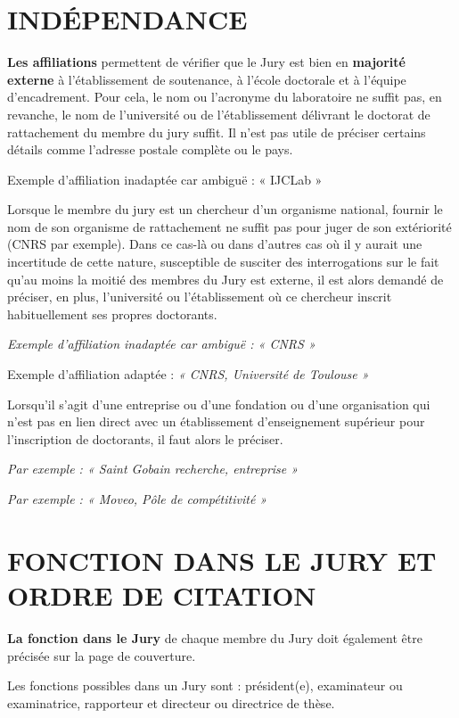 \documentclass[main=french,a4paper]{book}
\begin{document}
\section{INDÉPENDANCE}
\textbf{Les affiliations} permettent de vérifier que le Jury est bien en \textbf{majorité externe} à l’établissement de soutenance, à l’école doctorale et à l’équipe d’encadrement. 
Pour cela, le nom ou l’acronyme du laboratoire ne suffit pas, en revanche, le nom de l’université ou de l’établissement délivrant le doctorat de rattachement du membre du jury suffit. Il n’est pas utile de préciser certains détails comme l’adresse postale complète ou le pays.\\ \par
Exemple d’affiliation inadaptée car ambiguë : « IJCLab »\\ \par
Lorsque le membre du jury est un chercheur d’un organisme national, fournir le nom de son organisme de rattachement ne suffit pas pour juger de son extériorité (CNRS par exemple). Dans ce cas-là ou dans d’autres cas où il y aurait une incertitude de cette nature, susceptible de susciter des interrogations sur le fait qu’au moins la moitié des membres du Jury est externe, il est alors demandé de préciser, en plus, l’université ou l’établissement où ce chercheur inscrit habituellement ses propres doctorants.\\ \par
\textit{Exemple d’affiliation inadaptée car ambiguë : « CNRS »}\\ \par
Exemple d’affiliation adaptée : \textit{« CNRS, Université de Toulouse »}\\ \par
Lorsqu’il s’agit d’une entreprise ou d’une fondation ou d’une organisation qui n’est pas en lien direct avec un établissement d’enseignement supérieur pour l’inscription de doctorants, il faut alors le préciser.\\ \par
\textit{Par exemple : « Saint Gobain recherche, entreprise »}\\ \par
\textit{Par exemple : « Moveo, Pôle de compétitivité »}
\newpage
\section{FONCTION DANS LE JURY ET ORDRE DE CITATION}
\textbf{La fonction dans le Jury} de chaque membre du Jury doit également être précisée sur la page de couverture.\\ \par
Les fonctions possibles dans un Jury sont : président(e), examinateur ou examinatrice, rapporteur et directeur ou directrice de thèse.
\end{document}
